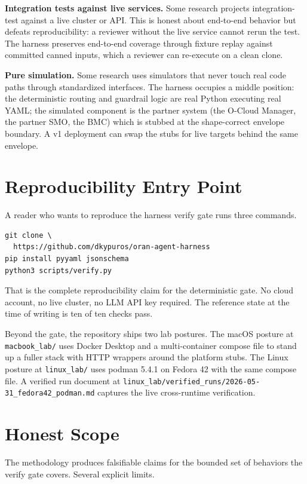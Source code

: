 \documentclass[twocolumn,10pt,a4paper]{article}
\begin{document}
\textbf{Integration tests against live services.} Some research projects integration-test against a live cluster or API. This is honest about end-to-end behavior but defeats reproducibility: a reviewer without the live service cannot rerun the test. The harness preserves end-to-end coverage through fixture replay against committed canned inputs, which a reviewer can re-execute on a clean clone.

\textbf{Pure simulation.} Some research uses simulators that never touch real code paths through standardized interfaces. The harness occupies a middle position: the deterministic routing and guardrail logic are real Python executing real YAML; the simulated component is the partner system (the O-Cloud Manager, the partner SMO, the BMC) which is stubbed at the shape-correct envelope boundary. A v1 deployment can swap the stubs for live targets behind the same envelope.

\section{Reproducibility Entry Point}
\label{sec:repro}

A reader who wants to reproduce the harness verify gate runs three commands.

\begin{verbatim}
git clone \
  https://github.com/dkypuros/oran-agent-harness
pip install pyyaml jsonschema
python3 scripts/verify.py
\end{verbatim}

That is the complete reproducibility claim for the deterministic gate. No cloud account, no live cluster, no LLM API key required. The reference state at the time of writing is ten of ten checks pass.

Beyond the gate, the repository ships two lab postures. The macOS posture at \texttt{macbook\_lab/} uses Docker Desktop and a multi-container compose file to stand up a fuller stack with HTTP wrappers around the platform stubs. The Linux posture at \texttt{linux\_lab/} uses podman 5.4.1 on Fedora 42 with the same compose file. A verified run document at \texttt{linux\_lab/verified\_runs/2026-05-31\_fedora42\_podman.md} captures the live cross-runtime verification.

\section{Honest Scope}

The methodology produces falsifiable claims for the bounded set of behaviors the verify gate covers. Several explicit limits.
\end{document}
